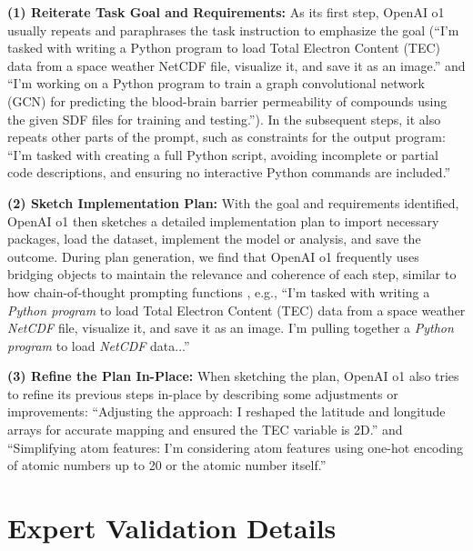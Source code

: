 \textbf{(1) Reiterate Task Goal and Requirements:} 
As its first step, OpenAI o1 usually repeats and paraphrases the task instruction to emphasize the goal (``I’m tasked with writing a Python program to load Total Electron Content (TEC) data from a space weather NetCDF file, visualize it, and save it as an image.'' and ``I’m working on a Python program to train a graph convolutional network (GCN) for predicting the blood-brain barrier permeability of compounds using the given SDF files for training and testing.'').
In the subsequent steps, it also repeats other parts of the prompt, such as constraints for the output program: ``I’m tasked with creating a full Python script, avoiding incomplete or partial code descriptions, and ensuring no interactive Python commands are included.''

\textbf{(2) Sketch Implementation Plan:} 
With the goal and requirements identified, OpenAI o1 then sketches a detailed implementation plan to import necessary packages, load the dataset, implement the model or analysis, and save the outcome. During plan generation, we find that OpenAI o1 frequently uses bridging objects to maintain the relevance and coherence of each step, similar to how chain-of-thought prompting functions \citep{wang-etal-2023-towards}, e.g., ``I’m tasked with writing a \textit{Python program} to load Total Electron Content (TEC) data from a space weather \textit{NetCDF} file, visualize it, and save it as an image. I’m pulling together a \textit{Python program} to load \textit{NetCDF} data...''

\textbf{(3) Refine the Plan In-Place:} 
When sketching the plan, OpenAI o1 also tries to refine its previous steps in-place by describing some adjustments or improvements: ``Adjusting the approach: I reshaped the latitude and longitude arrays for accurate mapping and ensured the TEC variable is 2D.'' and ``Simplifying atom features: I’m considering atom features using one-hot encoding of atomic numbers up to 20 or the atomic number itself.''



\newpage
\setcounter{table}{0}
\renewcommand\thetable{\Alph{section}.\arabic{table}}
\setcounter{figure}{0}
\renewcommand\thefigure{\Alph{section}.\arabic{figure}}

\section{Expert Validation Details}
\label{app:data_collection_details}


